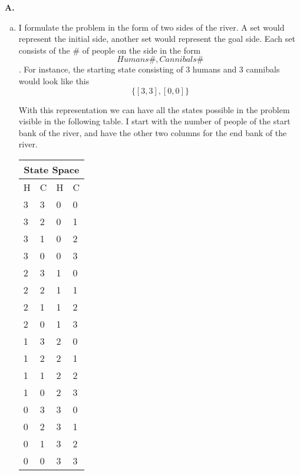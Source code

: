 \documentclass[12pt]{amsart}
\begin{document}
\textbf{A.}

\begin{enumerate}[a)]
  \item I formulate the problem in the form of two sides of the river. A set would represent the initial side, another set would represent the goal side. Each set consists of the \# of people on the side in the form \[Humans\#, Cannibals\#\]. For instance, the starting state consisting of 3 humans and 3 cannibals would look like this\[ \{[3,3],[0,0]\} \]
  
  With this representation we can have all the states possible in the problem visible in the following table. I start with the number of people of the start bank of the river, and have the other two columns for the end bank of the river.
  
  \begin{tabular}{ |p{1cm}||p{1cm}|p{1cm}| p{1cm}|  }
 \hline
 \multicolumn{4}{|c|}{State Space} \\
 \hline
H & C & H& C \\
 \hline
\cellcolor[HTML]{0000FF} 3   & \cellcolor[HTML]{0000FF} 3 &\cellcolor[HTML]{0000FF} 0 & \cellcolor[HTML]{0000FF} 0\\
3 &   2  & 0 & 1\\
3 &   1 & 0 & 2\\
3 & 0   & 0 & 3\\
 \cellcolor[HTML]{AA0044} 2   &   \cellcolor[HTML]{AA0044}3 &   \cellcolor[HTML]{AA0044}1 &   \cellcolor[HTML]{AA0044}0\\
2 &   2  & 1& 1\\
 \cellcolor[HTML]{AA0044} 2 &   \cellcolor[HTML]{AA0044} 1 &  \cellcolor[HTML]{AA0044} 1 & \cellcolor[HTML]{AA0044} 2\\
 \cellcolor[HTML]{AA0044} 2 & \cellcolor[HTML]{AA0044} 0   & \cellcolor[HTML]{AA0044} 1 &  \cellcolor[HTML]{AA0044} 3\\
 \cellcolor[HTML]{AA0044}1   &  \cellcolor[HTML]{AA0044} 3 &  \cellcolor[HTML]{AA0044}2 &  \cellcolor[HTML]{AA0044}0\\
 \cellcolor[HTML]{AA0044}1 &    \cellcolor[HTML]{AA0044} 2  &  \cellcolor[HTML]{AA0044} 2&  \cellcolor[HTML]{AA0044} 1\\
1 &   1 & 2 & 2\\
  \cellcolor[HTML]{AA0044} 1 &  \cellcolor[HTML]{AA0044} 0   & \cellcolor[HTML]{AA0044}  2 &  \cellcolor[HTML]{AA0044} 3\\
0   & 3 & 3 & 0\\
0 &   2  & 3& 1\\
0 &   1 & 3 & 2\\
\cellcolor[HTML]{00FF00} 0 &\cellcolor[HTML]{00FF00} 0   &\cellcolor[HTML]{00FF00} 3 & \cellcolor[HTML]{00FF00} 3\\
 \hline
 

\end{tabular}
\end{enumerate}
\end{document}
